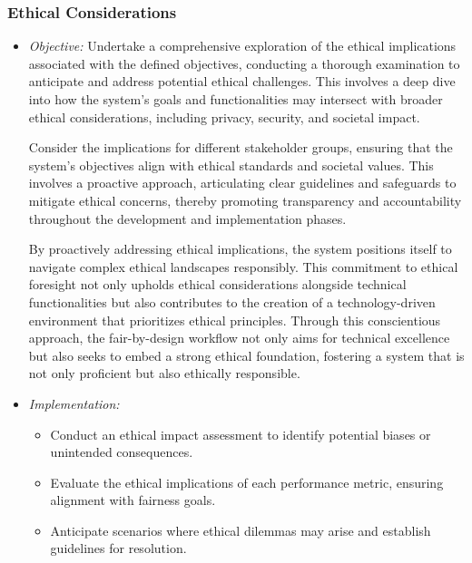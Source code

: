 \subsubsection{Ethical Considerations}

\begin{itemize}

    \item \emph{Objective:} Undertake a comprehensive exploration of the ethical implications associated with the defined objectives, conducting a thorough examination to anticipate and address potential ethical challenges. This involves a deep dive into how the system's goals and functionalities may intersect with broader ethical considerations, including privacy, security, and societal impact.

    Consider the implications for different stakeholder groups, ensuring that the system's objectives align with ethical standards and societal values. This involves a proactive approach, articulating clear guidelines and safeguards to mitigate ethical concerns, thereby promoting transparency and accountability throughout the development and implementation phases.
    
    By proactively addressing ethical implications, the system positions itself to navigate complex ethical landscapes responsibly. This commitment to ethical foresight not only upholds ethical considerations alongside technical functionalities but also contributes to the creation of a technology-driven environment that prioritizes ethical principles. Through this conscientious approach, the fair-by-design workflow not only aims for technical excellence but also seeks to embed a strong ethical foundation, fostering a system that is not only proficient but also ethically responsible.

    \item \emph{Implementation:}

        \begin{itemize}

            \item Conduct an ethical impact assessment to identify potential biases or unintended consequences.

            \item Evaluate the ethical implications of each performance metric, ensuring alignment with fairness goals.

            \item Anticipate scenarios where ethical dilemmas may arise and establish guidelines for resolution.

        \end{itemize}

\end{itemize}


